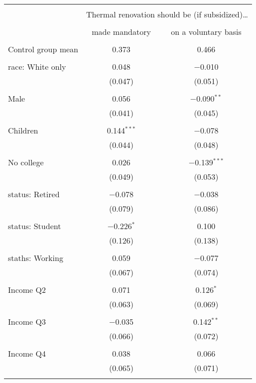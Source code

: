 
\begin{tabular}{@{\extracolsep{5pt}}lcc} 
\\[-1.8ex]\hline 
\hline \\[-1.8ex] 
 & \multicolumn{2}{c}{Thermal renovation should be (if subsidized)…} \\ 
\cline{2-3} 
\\[-1.8ex] & made mandatory & on a voluntary basis \\ 
\hline \\[-1.8ex] 
 Control group mean & 0.373 & 0.466  \\ \hline \\[-1.8ex] race: White only & 0.048 & $-$0.010 \\ 
  & (0.047) & (0.051) \\ 
  & & \\ 
 Male & 0.056 & $-$0.090$^{**}$ \\ 
  & (0.041) & (0.045) \\ 
  & & \\ 
 Children & 0.144$^{***}$ & $-$0.078 \\ 
  & (0.044) & (0.048) \\ 
  & & \\ 
 No college & 0.026 & $-$0.139$^{***}$ \\ 
  & (0.049) & (0.053) \\ 
  & & \\ 
 status: Retired & $-$0.078 & $-$0.038 \\ 
  & (0.079) & (0.086) \\ 
  & & \\ 
 status: Student & $-$0.226$^{*}$ & 0.100 \\ 
  & (0.126) & (0.138) \\ 
  & & \\ 
 staths: Working & 0.059 & $-$0.077 \\ 
  & (0.067) & (0.074) \\ 
  & & \\ 
 Income Q2 & 0.071 & 0.126$^{*}$ \\ 
  & (0.063) & (0.069) \\ 
  & & \\ 
 Income Q3 & $-$0.035 & 0.142$^{**}$ \\ 
  & (0.066) & (0.072) \\ 
  & & \\ 
 Income Q4 & 0.038 & 0.066 \\ 
  & (0.065) & (0.071) \\ 
  & & \\ 

\end{tabular}
